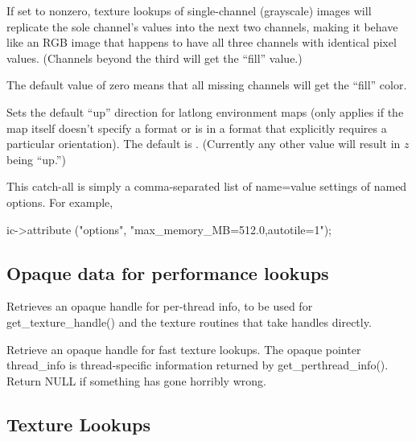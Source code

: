 If set to nonzero, texture lookups of single-channel (grayscale) 
images will replicate the sole channel's values into the next two
channels, making it behave like an RGB image that happens to have all
three channels with identical pixel values.  (Channels beyond the third
will get the ``fill'' value.)

The default value of zero means that all missing channels will get
the ``fill'' color.
\apiend

Sets the default ``up'' direction for latlong environment maps (only
applies if the map itself doesn't specify a format or is in a format
that explicitly requires a particular orientation).  The default is
.  (Currently any other value will result in $z$ being ``up.'')
\apiend

This catch-all is simply a comma-separated list of {\cf name=value}
settings of named options.  For example,
\begin{code}
        ic->attribute ("options", "max_memory_MB=512.0,autotile=1");
\end{code}
\apiend



\subsection{Opaque data for performance lookups}
\label{sec:texturesys:api:opaque}


Retrieves an opaque handle for per-thread info, to be used for
{\cf get_texture_handle()} and the texture routines that take handles
directly.
\apiend


Retrieve an opaque handle for fast texture lookups.  The opaque
pointer {\cf thread_info} is thread-specific information returned by
{\cf get_perthread_info()}.  Return {\cf NULL} if something has gone
horribly wrong.

\apiend


\subsection{Texture Lookups}
\label{sec:texturesys:api:texture}

